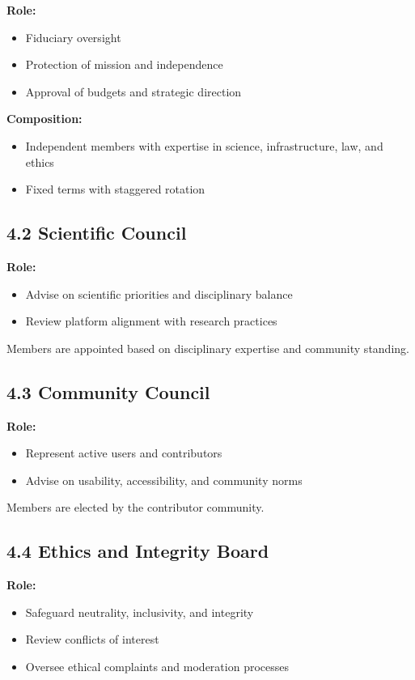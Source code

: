 \textbf{Role:}
\begin{itemize}
    \item Fiduciary oversight
    \item Protection of mission and independence
    \item Approval of budgets and strategic direction
\end{itemize}

\textbf{Composition:}
\begin{itemize}
    \item Independent members with expertise in science, infrastructure, law, and ethics
    \item Fixed terms with staggered rotation
\end{itemize}

\subsection*{4.2 Scientific Council}

\textbf{Role:}
\begin{itemize}
    \item Advise on scientific priorities and disciplinary balance
    \item Review platform alignment with research practices
\end{itemize}

Members are appointed based on disciplinary expertise and community standing.

\subsection*{4.3 Community Council}

\textbf{Role:}
\begin{itemize}
    \item Represent active users and contributors
    \item Advise on usability, accessibility, and community norms
\end{itemize}

Members are elected by the contributor community.

\subsection*{4.4 Ethics and Integrity Board}

\textbf{Role:}
\begin{itemize}
    \item Safeguard neutrality, inclusivity, and integrity
    \item Review conflicts of interest
    \item Oversee ethical complaints and moderation processes
\end{itemize}

